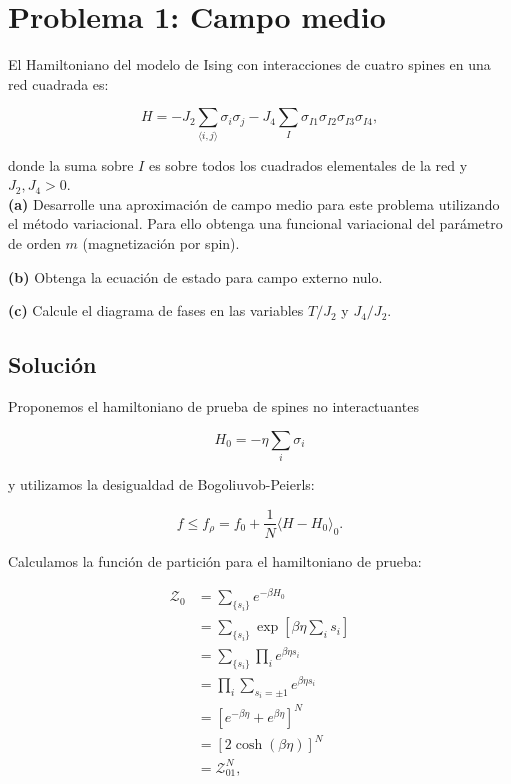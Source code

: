 \documentclass[10pt]{article}
\begin{document}
\section*{Problema 1: Campo medio}

El Hamiltoniano del modelo de Ising con interacciones de cuatro spines en una red cuadrada es:

\begin{equation}
H = -J_2 \sum_{\langle i,j\rangle} \sigma_i \sigma_j - J_4 \sum_I \sigma_{I1}\sigma_{I2}\sigma_{I3}\sigma_{I4},
\end{equation}

donde la suma sobre $I$ es sobre todos los cuadrados elementales de la red y $J_2,J_4>0$.\\

\textbf{(a)} Desarrolle una aproximaci\'on de campo medio para este problema utilizando el m\'etodo variacional. Para ello obtenga una funcional variacional del par\'ametro de orden $m$ (magnetizaci\'on por spin).

\textbf{(b)} Obtenga la ecuaci\'on de estado para campo externo nulo.

\textbf{(c)} Calcule el diagrama de fases en las variables $T/J_2$ y $J_4/J_2$.

\subsection*{Soluci\'on}


Proponemos el hamiltoniano de prueba de spines no interactuantes

\begin{equation}
H_0 = -\eta \sum_i \sigma_i
\end{equation}

y utilizamos la desigualdad de Bogoliuvob-Peierls:

\begin{equation}
f \leq f_{\rho} = f_0 + \dfrac{1}{N} \langle H - H_0 \rangle_0.
\end{equation}

Calculamos la funci\'on de partici\'on para el hamiltoniano de prueba:

\begin{align}
\mathcal{Z}_0 &= \sum_{\lbrace s_i\rbrace} e^{-\beta H_0} \nonumber \\
&= \sum_{\lbrace s_i\rbrace} \exp \left[ \beta \eta \sum_i s_i  \right] \nonumber \\
&= \sum_{\lbrace s_i\rbrace} \prod_i  e^{\beta \eta s_i} \nonumber \\
&= \prod_i \sum_{s_i=\pm1} e^{\beta \eta s_i}  \nonumber \\
&= \left[ e^{-\beta \eta} + e^{\beta \eta} \right]^N \nonumber \\
&= \left[ 2 \cosh\left(\beta \eta\right) \right]^N \nonumber \\
&= \mathcal{Z}_{01}^N,
\end{align}
\end{document}
